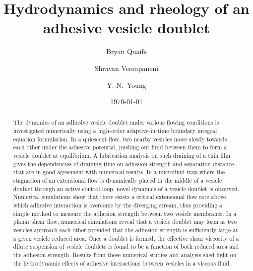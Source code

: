 \documentclass[prf,superscriptaddress,showpacs]{revtex4-1}
\begin{document}

\title{Hydrodynamics and rheology of an adhesive vesicle doublet}

\author{Bryan Quaife}
\author{Shravan Veerapaneni}%
%
\author{Y.-N.~Young}%
%

\date{\today}%

\begin{abstract}
The dynamics of an adhesive vesicle doublet under various flowing conditions is
investigated numerically using a high-order adaptive-in-time boundary
integral equation formulation. In a quiescent flow, two nearby vesicles
move slowly towards each other under the adhesive potential, pushing out
fluid between them to form a vesicle doublet at equilibrium. A lubrication
analysis on such draining of a thin film gives the dependencies of
draining time on adhesion strength and separation distance that are in
good agreement with numerical results.
%
In a microfluid trap where the stagnation of an extensional flow is dynamically
placed in the middle of a vesicle doublet through an active control
loop, novel dynamics of a vesicle doublet is observed. Numerical
simulations show that there exists a critical extensional flow rate
above which adhesive interaction is overcome by the 
diverging stream, thus providing a simple method to measure the adhesion
strength between two vesicle membranes. 
%
In a planar shear flow, numerical simulations reveal that a vesicle
doublet may form as two vesicles approach each other provided that the adhesion
strength is sufficiently large at a given vesicle reduced area. Once a
doublet is formed, the effective shear viscosity of a dilute suspension
of vesicle doublets is found to be a function of both reduced area and
the adhesion strength.  Results from these numerical studies and
analysis shed light on the hydrodynamic effects of adhesive interactions
between vesicles in a viscous fluid.
\end{abstract}
\end{document}
